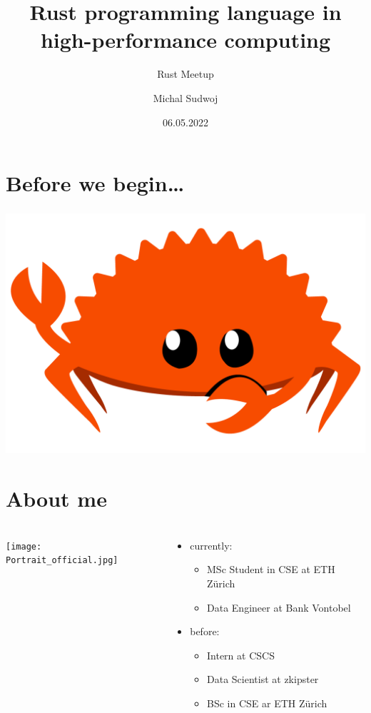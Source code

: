 \documentclass[aspectratio=43, t]{beamer}
\author{Michal Sudwoj}
\title{Rust programming language in high-performance computing}
\subtitle{Rust Meetup}
\date{06.05.2022}
\begin{document}
\renewcommand{\fcolorbox}[4][]{#4}

\begin{frame}[plain, c]
	\titlepage
\end{frame}

\section*{Before we begin…}
\begin{frame}
	\frametitle{\secname}
	\includegraphics[width = \textwidth, height = \textheight, keepaspectratio]{rustacean-flat-gesture.png}
\end{frame}

\section*{About me}
\begin{frame}
	\frametitle{\secname}

	\begin{columns}[T]
		\begin{column}{5cm}
			\texttt{[image: Portrait\_official.jpg]}
		\end{column}
		\begin{column}{5cm}
			\begin{itemize}
				\item currently:
					\begin{itemize}
						\item MSc Student in CSE at ETH Zürich
						\item Data Engineer at Bank Vontobel
					\end{itemize}
				\item before:
					\begin{itemize}
						\item Intern at CSCS
						\item Data Scientist at zkipster
						\item BSc in CSE ar ETH Zürich
					\end{itemize}
			\end{itemize}
		\end{column}
	\end{columns}
\end{frame}
\end{document}
